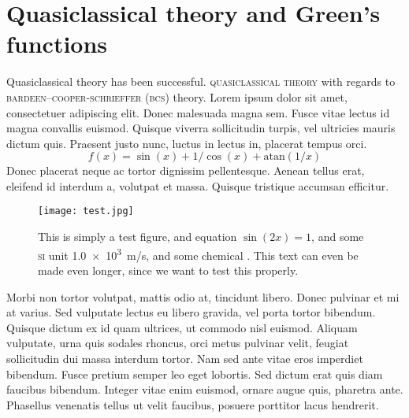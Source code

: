 %

\section{Quasiclassical theory and Green's functions}\label{sec:test2}
Quasiclassical theory has been successful.
\textsc{quasiclassical theory} with regards to \textsc{bardeen--cooper-schrieffer (bcs)} theory.
Lorem ipsum dolor sit amet, consectetuer adipiscing elit.
Donec malesuada magna sem.
Fusce vitae lectus id magna convallis euismod.
Quisque viverra sollicitudin turpis, vel ultricies mauris dictum quis.
Praesent justo nunc, luctus in lectus in, placerat tempus orci.
\begin{equation}
  f(x) = \sin(x) + 1/\cos(x) + \mathrm{atan}(1/x)
\end{equation}
Donec placerat neque ac tortor dignissim pellentesque.
Aenean tellus erat, eleifend id interdum a, volutpat et massa.
Quisque tristique accumsan efficitur.

\begin{figure}[h!]
  \centering
  \texttt{[image: test.jpg]}
  \caption{This is simply a test figure, and equation $\sin(2x)=1$, and some \textsc{si} unit \SI{1.0e3}{m/s}, and some chemical . This text can even be made even longer, since we want to test this properly.}
  \label{fig:test}
\end{figure}


Morbi non tortor volutpat, mattis odio at, tincidunt libero.
Donec pulvinar et mi at varius.
Sed vulputate lectus eu libero gravida, vel porta tortor bibendum.
Quisque dictum ex id quam ultrices, ut commodo nisl euismod.
Aliquam vulputate, urna quis sodales rhoncus, orci metus pulvinar velit, feugiat sollicitudin dui massa interdum tortor.
Nam sed ante vitae eros imperdiet bibendum.
Fusce pretium semper leo eget lobortis.
Sed dictum erat quis diam faucibus bibendum.
Integer vitae enim euismod, ornare augue quis, pharetra ante.
Phasellus venenatis tellus ut velit faucibus, posuere porttitor lacus hendrerit.

